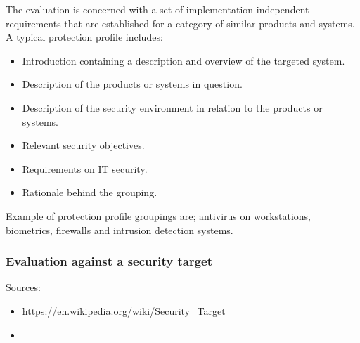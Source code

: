 \documentclass[10pt]{article}
\newcommand{\e}[1]{\PVerb{#1}}
\begin{document}
        The evaluation is concerned with a set of implementation-independent
        requirements that are established for a category of similar products
        and systems. A typical protection profile includes:
        \begin{itemize}
          \item{Introduction containing a description and overview of the
            targeted system.}
          \item{Description of the products or systems in question.}
          \item{Description of the security environment in relation to the
            products or systems.}
          \item{Relevant security objectives.}
          \item{Requirements on IT security.}
          \item{Rationale behind the grouping.}
        \end{itemize}
        Example of protection profile groupings are; antivirus on workstations,
        biometrics, firewalls and intrusion detection systems.

      \subsubsection{Evaluation against a security target}
      Sources:
      \begin{itemize}
        \item{\url{https://en.wikipedia.org/wiki/Security_Target}}
        \item{\e{slides_on_cc.pdf}}
      \end{itemize}
\end{document}
